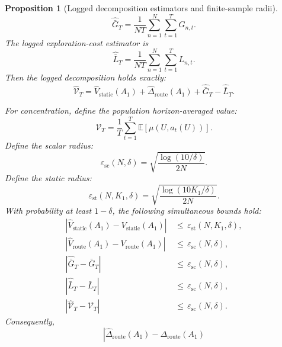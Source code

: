 \documentclass{article} %
\newtheorem{proposition}[theorem]{Proposition}
\begin{document}
\begin{proposition}[Logged decomposition estimators and finite-sample radii]
\begin{equation}
\label{eq:app-six-hat-G}
\widehat{\bar G}_T
=
\frac{1}{NT}\sum_{n=1}^{N}\sum_{t=1}^{T}G_{n,t}.
\end{equation}
The logged exploration-cost estimator is
\begin{equation}
\label{eq:app-six-hat-L}
\widehat{\bar L}_T
=
\frac{1}{NT}\sum_{n=1}^{N}\sum_{t=1}^{T}L_{n,t}.
\end{equation}
Then the logged decomposition holds exactly:
\begin{equation}
\label{eq:app-six-sample-identity}
\widehat{\mathcal{V}}_T
=
\widehat V_{\mathrm{static}}(A_1)
+
\widehat\Delta_{\mathrm{route}}(A_1)
+
\widehat{\bar G}_T
-
\widehat{\bar L}_T.
\end{equation}

For concentration, define the population horizon-averaged value:
\begin{equation}
\label{eq:app-six-pop-value}
\mathcal{V}_T
=
\frac{1}{T}\sum_{t=1}^{T}\mathbb{E}[\mu(U,a_t(U))].
\end{equation}
Define the scalar radius:
\begin{equation}
\label{eq:app-six-scalar-radius}
\varepsilon_{\mathrm{sc}}(N,\delta)
=
\sqrt{\frac{\log(10/\delta)}{2N}}.
\end{equation}
Define the static radius:
\begin{equation}
\label{eq:app-six-static-radius}
\varepsilon_{\mathrm{st}}(N,K_1,\delta)
=
\sqrt{\frac{\log(10K_1/\delta)}{2N}}.
\end{equation}
With probability at least \(1-\delta\), the following simultaneous bounds hold:
\begin{align}
\label{eq:app-six-estimator-bounds}
\left|
\widehat V_{\mathrm{static}}(A_1)-V_{\mathrm{static}}(A_1)
\right|
&\,\le\,
\varepsilon_{\mathrm{st}}(N,K_1,\delta),
\\
\left|
\widehat V_{\mathrm{route}}(A_1)-V_{\mathrm{route}}(A_1)
\right|
&\,\le\,
\varepsilon_{\mathrm{sc}}(N,\delta),
\\
\left|
\widehat{\bar G}_T-\bar G_T
\right|
&\,\le\,
\varepsilon_{\mathrm{sc}}(N,\delta),
\\
\left|
\widehat{\bar L}_T-\bar L_T
\right|
&\,\le\,
\varepsilon_{\mathrm{sc}}(N,\delta),
\\
\left|
\widehat{\mathcal{V}}_T-\mathcal{V}_T
\right|
&\,\le\,
\varepsilon_{\mathrm{sc}}(N,\delta).
\end{align}
Consequently,
\begin{equation}
\label{eq:app-six-delta-radius}
\left|
\widehat\Delta_{\mathrm{route}}(A_1)-\Delta_{\mathrm{route}}(A_1)

\end{equation}
\end{proposition}
\end{document}
